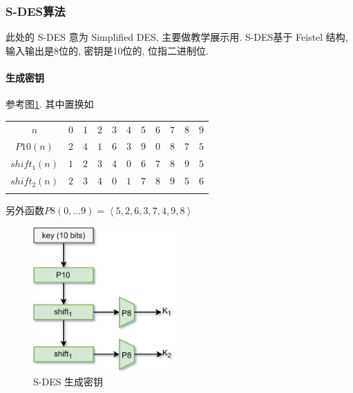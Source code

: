 \documentclass{ctexart}
\newlength{\Oldarrayrulewidth}
\newcommand{\Hline}[1]{
  \noalign{\global\setlength{\Oldarrayrulewidth}{\arrayrulewidth}}
  \noalign{\global\setlength{\arrayrulewidth}{#1}}\hline
  \noalign{\global\setlength{\arrayrulewidth}{\Oldarrayrulewidth}}}
\newcommand{\Topline}{\Hline{0.08em}}
\newcommand{\Bottomline}{\Hline{0.08em}}
\newcommand{\Midline}{\Hline{0.05em}}
\begin{document}
\subsubsection{S-DES算法}
    此处的 S-DES 意为 Simplified DES, 主要做教学展示用.
    S-DES基于 Feistel 结构, 输入输出是8位的, 密钥是10位的, 位指二进制位.\par
\paragraph{生成密钥}
    参考图\ref{s-des-keygen}. 其中置换如
    \begin{center}
    \begin{tabularx}{0.8\textwidth}{cCCCCCCCCCC}
    \Topline
    $n$ & $0$  & $1$  & $2$  & $3$  & $4$  & $5$  & $6$  & $7$  & $8$  & $9$ \\
        \Midline
        $P10(n)$ & $2$&   $4$&    $1$&  $6$&   $3$&   $9$&    $0$&   $8$&   $7$&   $5$\\
        $shift_1(n)$ & $1$  & $2$  & $3$  & $4$ & $0$ & $6$  & $7$  & $8$  & $9$ & $5$\\
        $shift_2(n)$ & $2$  & $3$  & $4$ & $0$ & $1$ & $7$  & $8$  & $9$ & $5$ & $6$\\
    \Bottomline
    \end{tabularx}
    \end{center}
    另外函数$P8(0,\ldots 9) = \left\langle 5, 2, 6, 3, 7, 4, 9, 8 \right\rangle$

    \begin{figure}[ht!]
        \centering
        \includegraphics[width=0.5\textwidth]{s-des-keygen.jpg}
        \caption{S-DES 生成密钥}
        \label{s-des-keygen}
    \end{figure}
\end{document}
